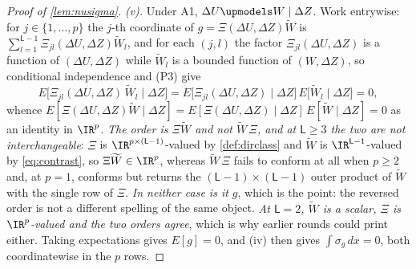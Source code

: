 \begin{proof}[Proof of \cref{lem:nusigma}]
\emph{(v).} Under A1, $\Delta U\upmodels W\mid\Delta Z$. Work entrywise: for $j\in\{1,\dots,p\}$ the
$j$-th coordinate of $g=\Xi(\Delta U,\Delta Z)\widetilde W$ is
$\sum_{l=1}^{\mathsf L-1}\Xi_{jl}(\Delta U,\Delta Z)\widetilde W_l$, and for each $(j,l)$ the factor
$\Xi_{jl}(\Delta U,\Delta Z)$ is a function of $(\Delta U,\Delta Z)$ while $\widetilde W_l$ is a bounded
function of $(W,\Delta Z)$, so conditional independence and (P3) give
\[
E\big[\Xi_{jl}(\Delta U,\Delta Z)\,\widetilde W_l\mid\Delta Z\big]
=E\big[\Xi_{jl}(\Delta U,\Delta Z)\mid\Delta Z\big]\,E\big[\widetilde W_l\mid\Delta Z\big]=0 ,
\]
whence $E[\Xi(\Delta U,\Delta Z)\widetilde W\mid\Delta Z]
=E[\Xi(\Delta U,\Delta Z)\mid\Delta Z]\,E[\widetilde W\mid\Delta Z]=0$ as an identity in $\IR^{p}$.
\emph{The order is $\Xi\widetilde W$ and not $\widetilde W\,\Xi$, and at $\mathsf L\ge3$ the two are not
interchangeable}: $\Xi$ is $\IR^{p\times(\mathsf L-1)}$-valued by
\cref{def:dirclass} and $\widetilde W$ is $\IR^{\mathsf L-1}$-valued by \eqref{eq:contrast}, so
$\Xi\widetilde W\in\IR^{p}$, whereas $\widetilde W\,\Xi$ fails to conform at all when $p\ge2$ and, at
$p=1$, conforms but returns the $(\mathsf L-1)\times(\mathsf L-1)$ outer product of $\widetilde W$ with
the single row of $\Xi$. \emph{In neither case is it $g$}, which is the point: the reversed order is not
a different spelling of the same object. \emph{At $\mathsf L=2$, $\widetilde W$
is a scalar, $\Xi$ is $\IR^{p}$-valued and the two orders agree}, which is why earlier rounds could
print either.
Taking expectations gives $E[g]=0$, and (iv) then gives $\int\sigma_g\,dx=0$, both
coordinatewise in the $p$ rows.
\end{proof}

